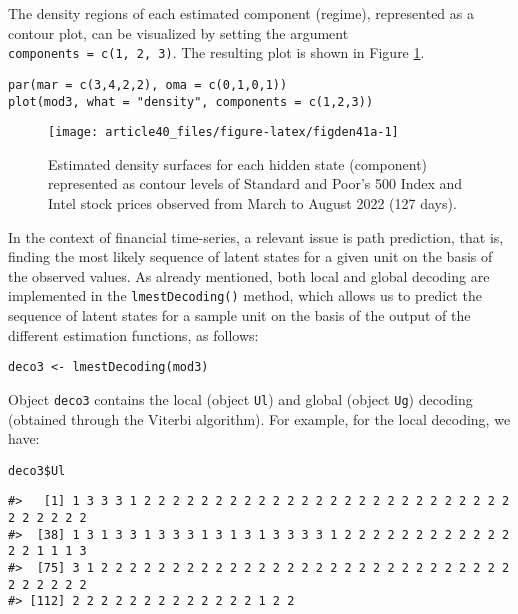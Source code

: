 The density regions of each estimated component (regime), represented as
a contour plot, can be visualized by setting the argument
\texttt{components\ =\ c(1,\ 2,\ 3)}. The resulting plot is shown in Figure
\ref{fig:figden41a}.

\begin{verbatim}
par(mar = c(3,4,2,2), oma = c(0,1,0,1))
plot(mod3, what = "density", components = c(1,2,3))
\end{verbatim}

\begin{figure}

{\centering \texttt{[image: article40\_files/figure-latex/figden41a-1]} 

}

\caption{Estimated density surfaces for each hidden state (component) represented as contour levels of Standard and Poor's 500 Index and Intel stock prices observed from March to August 2022 (127 days).}\label{fig:figden41a}
\end{figure}

In the context of financial time-series, a relevant issue is path
prediction, that is, finding the most likely sequence of latent states
for a given unit on the basis of the observed values. As already
mentioned, both local and global decoding are implemented in the
\texttt{lmestDecoding()} method, which allows us to predict the sequence of
latent states for a sample unit on the basis of the output of the
different estimation functions, as follows:

\begin{verbatim}
deco3 <- lmestDecoding(mod3)
\end{verbatim}

Object \texttt{deco3} contains the local (object \texttt{Ul}) and global (object \texttt{Ug})
decoding (obtained through the Viterbi algorithm). For example, for the
local decoding, we have:

\begin{verbatim}
deco3$Ul
\end{verbatim}

\begin{verbatim}
#>   [1] 1 3 3 3 1 2 2 2 2 2 2 2 2 2 2 2 2 2 2 2 2 2 2 2 2 2 2 2 2 2 2 2 2 2 2 2 2
#>  [38] 1 3 1 3 3 1 3 3 3 1 3 1 3 1 3 3 3 3 1 2 2 2 2 2 2 2 2 2 2 2 2 2 2 1 1 1 3
#>  [75] 3 1 2 2 2 2 2 2 2 2 2 2 2 2 2 2 2 2 2 2 2 2 2 2 2 2 2 2 2 2 2 2 2 2 2 2 2
#> [112] 2 2 2 2 2 2 2 2 2 2 2 2 2 1 2 2
\end{verbatim}

